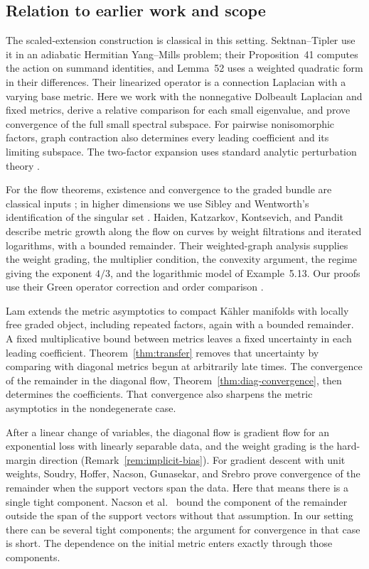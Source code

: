 \documentclass[11pt]{amsart}
\theoremstyle{definition}
\theoremstyle{remark}
\begin{document}
\subsection{Relation to earlier work and scope}\label{sec:earlier-work}

The scaled-extension construction is classical in this setting.
Sektnan--Tipler \cite[Section~5]{SektnanTipler2024} use it in an
adiabatic Hermitian Yang--Mills problem; their Proposition~41 computes
the action on summand identities, and Lemma~52 uses a weighted quadratic
form in their differences. Their linearized operator is a connection
Laplacian with a varying base metric. Here we work with the nonnegative
Dolbeault Laplacian and fixed metrics, derive a relative comparison for
each small eigenvalue, and prove convergence of the full small spectral
subspace. For pairwise nonisomorphic factors, graph contraction also
determines every leading coefficient and its limiting subspace.
The two-factor expansion uses standard analytic perturbation theory
\cite[Chapter~VII]{Kato1995}.

For the flow theorems, existence and convergence to the graded bundle are
classical inputs \cite{Daskalopoulos1992,Rade1992}; in higher dimensions we
use Sibley and Wentworth's identification of the singular set
\cite[Theorem~1.1]{SibleyWentworth2015}. Haiden, Katzarkov, Kontsevich, and
Pandit \cite{HKKP2018} describe metric growth along the flow on curves by
weight filtrations and iterated logarithms, with a bounded remainder. Their
weighted-graph analysis \cite[Section~3]{HKKP2023} supplies the weight
grading, the multiplier condition, the convexity argument, the regime giving
the exponent $4/3$, and the logarithmic model of Example~5.13. Our proofs
use their Green operator correction and order comparison
\cite[Sections~3.5 and~4.2]{HKKP2018}.

Lam \cite[Theorems~1.1 and~8.2, Proposition~8.6]{Lam2026} extends the
metric asymptotics to compact K\"ahler manifolds with locally free graded
object, including repeated factors, again with a bounded remainder. A fixed
multiplicative bound between metrics leaves a fixed uncertainty in each
leading coefficient. Theorem~\ref{thm:transfer} removes that uncertainty by
comparing with diagonal metrics begun at arbitrarily late times. The
convergence of the remainder in the diagonal flow,
Theorem~\ref{thm:diag-convergence}, then determines the coefficients. That
convergence also sharpens the metric asymptotics in the nondegenerate case.

After a linear change of variables, the diagonal flow is gradient flow for
an exponential loss with linearly separable data, and the weight grading is
the hard-margin direction (Remark~\ref{rem:implicit-bias}). For gradient
descent with unit weights, Soudry, Hoffer, Nacson, Gunasekar, and Srebro
\cite{Soudry2018} prove convergence of the remainder when the support vectors
span the data. Here that means there is a single tight component. Nacson et
al.\ \cite[Theorem~10]{Nacson2019} bound the component of the remainder
outside the span of the support vectors without that assumption.
In our setting there can be several tight components; the argument for
convergence in that case is short. The dependence on the initial metric
enters exactly through those components.
\end{document}
